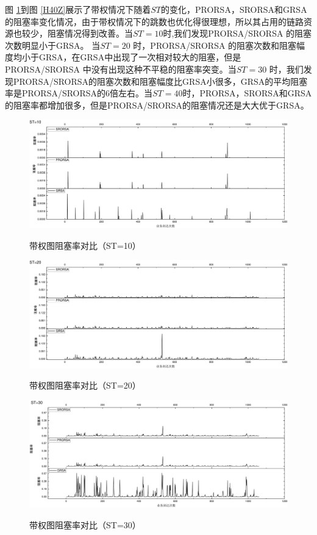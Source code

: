 图 \ref{H10Z}到图 \ref{H40Z}展示了带权情况下随着$ST$的变化，PRORSA，SRORSA和GRSA的阻塞率变化情况，由于带权情况下的跳数也优化得很理想，所以其占用的链路资源也较少，阻塞情况得到改善。当$ST=10$时,我们发现PRORSA/SRORSA 的阻塞次数明显小于GRSA。 当$ST=20$ 时，PRORSA/SRORSA 的阻塞次数和阻塞幅度均小于GRSA，在GRSA中出现了一次相对较大的阻塞，但是PRORSA/SRORSA 中没有出现这种不平稳的阻塞率突变。当$ST=30$ 时，我们发现PRORSA/SRORSA的阻塞次数和阻塞幅度比GRSA小很多，GRSA的平均阻塞率是PRORSA/SRORSA的6倍左右。当$ST=40$时，PRORSA，SRORSA和GRSA 的阻塞率都增加很多，但是PRORSA/SRORSA的阻塞情况还是大大优于GRSA。
\begin{figure}
\setlength{\belowcaptionskip}{-0.5cm}
\begin{center}
{\includegraphics[width=1 \textwidth]{figures/H10Z.pdf}}
\end{center}
\caption{{\footnotesize{带权图阻塞率对比（ST=10）}}}
\label{H10Z}
\end{figure}
\begin{figure}
\setlength{\belowcaptionskip}{-0.5cm}
\begin{center}
{\includegraphics[width=1 \textwidth]{figures/H20Z.pdf}}
\end{center}
\caption{{\footnotesize{带权图阻塞率对比（ST=20）}}}
\label{H20Z}
\end{figure}
\begin{figure}
\setlength{\belowcaptionskip}{-0.5cm}
\begin{center}
{\includegraphics[width=1 \textwidth]{figures/H30Z.pdf}}
\end{center}
\caption{{\footnotesize{带权图阻塞率对比（ST=30）}}}
\label{H30Z}
\end{figure}
